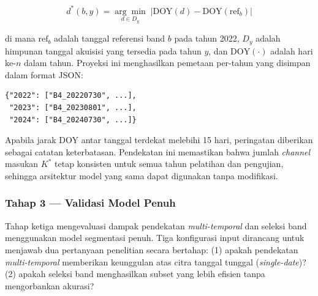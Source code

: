 \begin{equation}
    d^*(b, y) = \underset{d \in D_y}{\arg\min}\; \left| \text{DOY}(d) - \text{DOY}(\text{ref}_b) \right|
\end{equation}

di mana $\text{ref}_b$ adalah tanggal referensi band $b$ pada tahun 2022, $D_y$ adalah himpunan tanggal akuisisi yang tersedia pada tahun $y$, dan $\text{DOY}(\cdot)$ adalah hari ke-$n$ dalam tahun.
Proyeksi ini menghasilkan pemetaan per-tahun yang disimpan dalam format JSON:
\begin{verbatim}
{"2022": ["B4_20220730", ...],
 "2023": ["B4_20230801", ...],
 "2024": ["B4_20240730", ...]}
\end{verbatim}

Apabila jarak DOY antar tanggal terdekat melebihi 15 hari, peringatan diberikan sebagai catatan keterbatasan.
Pendekatan ini memastikan bahwa jumlah \textit{channel} masukan $K^*$ tetap konsisten untuk semua tahun pelatihan dan pengujian, sehingga arsitektur model yang sama dapat digunakan tanpa modifikasi.

\subsubsection{Tahap 3 — Validasi Model Penuh}

Tahap ketiga mengevaluasi dampak pendekatan \textit{multi-temporal} dan seleksi band menggunakan model segmentasi penuh.
Tiga konfigurasi input dirancang untuk menjawab dua pertanyaan penelitian secara bertahap:
(1) apakah pendekatan \textit{multi-temporal} memberikan keunggulan atas citra tanggal tunggal (\textit{single-date})?
(2) apakah seleksi band menghasilkan subset yang lebih efisien tanpa mengorbankan akurasi?

